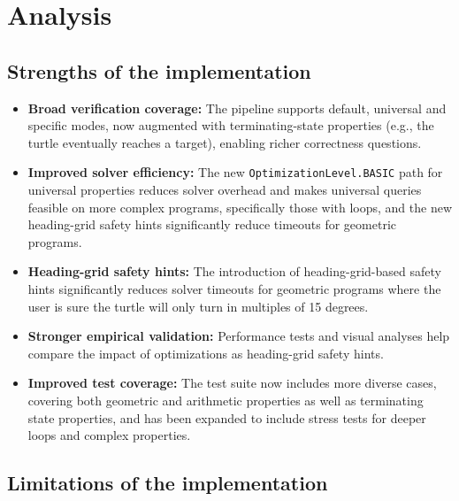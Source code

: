 \section*{Analysis}

\subsection*{Strengths of the implementation}

\begin{itemize}[leftmargin=1.5em]
    \item \textbf{Broad verification coverage:} The pipeline supports default, universal and specific modes, now augmented with terminating-state properties (e.g., the turtle eventually reaches a target), enabling richer correctness questions.
    \item \textbf{Improved solver efficiency:} The new \texttt{OptimizationLevel.BASIC} path for universal properties reduces solver overhead and makes universal queries feasible on more complex programs, specifically those with loops, and the new heading-grid safety hints significantly reduce timeouts for geometric programs.
    \item \textbf{Heading-grid safety hints:} The introduction of heading-grid-based safety hints significantly reduces solver timeouts for geometric programs where the user is sure the turtle will only turn in multiples of 15 degrees.
    \item \textbf{Stronger empirical validation:} Performance tests and visual analyses help compare the impact of optimizations as heading-grid safety hints.
    \item \textbf{Improved test coverage:} The test suite now includes more diverse cases, covering both geometric and arithmetic properties as well as terminating state properties, and has been expanded to include stress tests for deeper loops and complex properties.
\end{itemize}

\subsection*{Limitations of the implementation}

